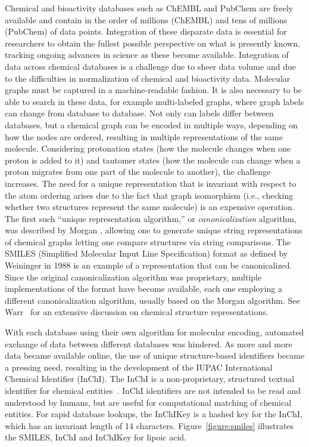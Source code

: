 \documentclass{../sig-alternate}
\begin{document}
Chemical and bioactivity
databases such as ChEMBL and PubChem are freely
available and contain in the order of millions (ChEMBL) and tens of
millions (PubChem) of data points. Integration of these disparate
data is essential for researchers to obtain the fullest possible
perspective on what is presently known, tracking ongoing advances in
science as these become available. Integration of data
across chemical databases is a challenge due to sheer data volume and
due to the difficulties in normalization of chemical and bioactivity
data. Molecular graphs must be captured
in a machine-readable fashion. It is also necessary to be able to 
search in these data, for example multi-labeled graphs, where graph labels can change
from database to database. Not only can labels differ between databases, 
but a chemical graph can be encoded in multiple ways, depending on how 
the nodes are ordered, resulting in multiple representations of the same
molecule. Considering protonation states 
(how the molecule changes when one proton is added
to it) and tautomer states (how the molecule can change when a proton
migrates from one part of the molecule to another), the challenge
increases. The need for a unique representation that is invariant with
respect to the atom ordering arises due to the fact that graph
isomorphism (i.e., checking whether two structures represent the same molecule) is an
expensive operation. The first such ``unique representation
algorithm,'' or \emph{canonicalization} algorithm, was described by
Morgan \cite{Morgan1965}, allowing one to generate unique string
representations of chemical graphs letting one compare structures via
string comparisons. The SMILES (Simplified Molecular Input Line
Specification) format as defined by Weininger in 1988 
\cite{Weininger:1988kx} is an example of a
representation that can be canonicalized. Since the original
canonicalization algorithm was proprietary, multiple implementations
of the format have become available, each one employing a different
canonicalization algorithm, usually based on the Morgan algorithm. See
Warr~\cite{Warr:2011vn} for an extensive discussion on chemical
structure representations.

With each database using their own algorithm for molecular encoding,
automated exchange of data between different databases was hindered.
As more and more data became available online, the use of unique
structure-based identifiers became a pressing need, resulting in the
development of the IUPAC International Chemical Identifier (InChI). The
InChI is a non-proprietary, structured textual identifier for chemical
entities~\cite{inchi}. InChI identifiers are not intended to be read
and understood by humans, but are useful for computational matching of
chemical entities. For rapid database lookups, the InChIKey is a
hashed key for the InChI, which has an invariant length of 14
characters. Figure~\ref{figure:smiles} illustrates
the SMILES, InChI and InChIKey for lipoic acid.
\end{document}
